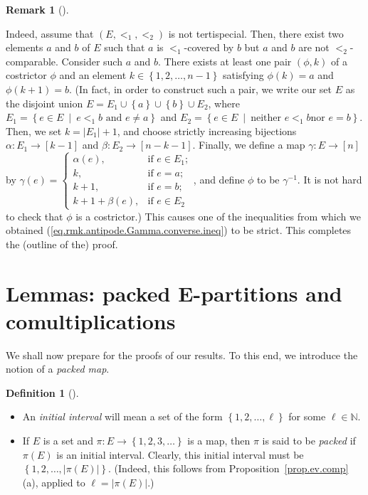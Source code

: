 \documentclass[numbers=enddot,12pt,final,onecolumn,notitlepage,abstracton]{scrartcl}
\theoremstyle{definition}
\newtheorem{defi}[theo]{Definition}
\newenvironment{definition}[1][]
{\begin{defi}[#1]\begin{leftbar}}
{\end{leftbar}\end{defi}}
\newtheorem{remk}[theo]{Remark}
\newenvironment{remark}[1][]
{\begin{remk}[#1]\begin{leftbar}}
{\end{leftbar}\end{remk}}
\newenvironment{verlong}{}{}
\newcommand{\EE}{{\mathbf{E}}}
\newcommand{\NN}{{\mathbb{N}}}
\begin{document}
\begin{remark}
\begin{verlong}
Indeed, assume that $\left(  E,<_{1},<_{2}\right)  $ is not tertispecial.
Then, there exist two elements $a$ and $b$ of $E$ such that $a$ is $<_{1}%
$-covered by $b$ but $a$ and $b$ are not $<_{2}$-comparable. Consider such $a$
and $b$. There exists at least one pair $\left(  \phi,k\right)  $ of a
costrictor $\phi$ and an element $k\in\left\{  1,2,\ldots,n-1\right\}  $
satisfying $\phi\left(  k\right)  =a$ and $\phi\left(  k+1\right)  =b$. (In
fact, in order to construct such a pair, we write our set $E$ as the
disjoint union $E=E_{1}\cup\left\{  a\right\}  \cup\left\{  b\right\}  \cup
E_{2}$, where $E_{1}=\left\{  e\in E\ \mid\ e<_{1}b\text{ and }e\neq
a\right\}  $ and $E_{2}=\left\{  e\in E\ \mid\ \text{neither }e<_{1}b\text{
nor }e=b\right\}  $. Then, we set $k=\left\vert E_{1}\right\vert +1$, and
choose strictly increasing bijections $\alpha:E_{1}\rightarrow\left[
k-1\right]  $ and $\beta:E_{2}\rightarrow\left[  n-k-1\right]  $. Finally, we
define a map $\gamma:E\rightarrow\left[  n\right]  $ by $\gamma\left(
e\right)  =
\begin{cases}
\alpha\left(  e\right)  , & \text{if }e\in E_{1};\\
k, & \text{if }e=a;\\
k+1, & \text{if }e=b;\\
k+1+\beta\left(  e\right)  , & \text{if }e\in E_{2}
\end{cases}
$, and define $\phi$ to be $\gamma^{-1}$. It is not hard to check that $\phi$
is a costrictor.) This causes one of the inequalities from which we obtained
(\ref{eq.rmk.antipode.Gamma.converse.ineq}) to be strict. This completes the
(outline of the) proof.
\end{verlong}
\end{remark}


\section{Lemmas: packed $\EE$-partitions and comultiplications}
\label{sect.lemmas}

We shall now prepare for the proofs of our results. To this end,
we introduce the notion of a \textit{packed map}.

\begin{definition}
\begin{itemize}

\item[(a)]
An \textit{initial interval} will mean a set of the form
$\left\{1, 2, \ldots, \ell\right\}$ for some $\ell \in \NN$.

\item[(b)]
If $E$ is a set and $\pi : E \to \left\{1, 2, 3, \ldots\right\}$ is
a map, then $\pi$ is said to be \textit{packed} if $\pi\left(E\right)$
is an initial interval. Clearly, this initial interval must be
$\left\{1, 2, \ldots, \left|\pi\left(E\right)\right|\right\}$.
\begin{verlong}
(Indeed, this follows from
Proposition~\ref{prop.ev.comp} (a), applied to
$\ell = \left|\pi\left(E\right)\right|$.)
\end{verlong}

\end{itemize}
\end{definition}
\end{document}
